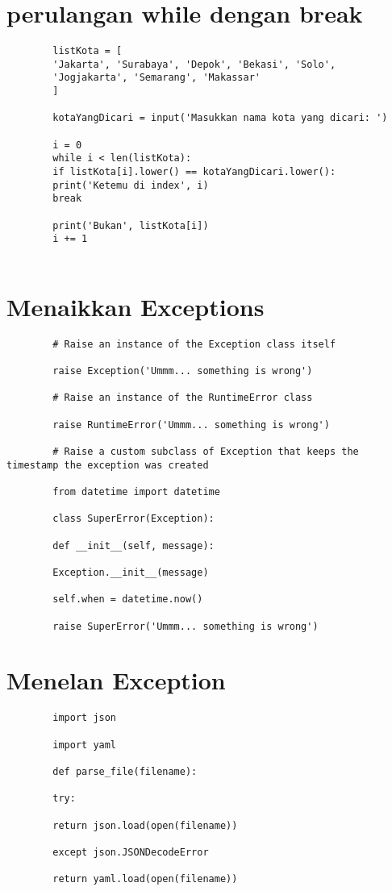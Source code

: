 \documentclass{article}
\begin{document}
	\section {perulangan while dengan break}
	\begin{lstlisting}
		listKota = [
		'Jakarta', 'Surabaya', 'Depok', 'Bekasi', 'Solo',
		'Jogjakarta', 'Semarang', 'Makassar'
		]
		
		kotaYangDicari = input('Masukkan nama kota yang dicari: ')
		
		i = 0
		while i < len(listKota):
		if listKota[i].lower() == kotaYangDicari.lower():
		print('Ketemu di index', i)
		break
		
		print('Bukan', listKota[i])
		i += 1
		
	\end{lstlisting}

	\section {Menaikkan Exceptions}
	\begin{lstlisting}
		# Raise an instance of the Exception class itself
		
		raise Exception('Ummm... something is wrong')
		
		# Raise an instance of the RuntimeError class
		
		raise RuntimeError('Ummm... something is wrong')
		
		# Raise a custom subclass of Exception that keeps the timestamp the exception was created
		
		from datetime import datetime
		
		class SuperError(Exception):
		
		def __init__(self, message):
		
		Exception.__init__(message)
		
		self.when = datetime.now()
		
		raise SuperError('Ummm... something is wrong')
	\end{lstlisting}

	\section {Menelan Exception}
	\begin{lstlisting}
		import json
		
		import yaml
		
		def parse_file(filename):
		
		try:
		
		return json.load(open(filename))
		
		except json.JSONDecodeError
		
		return yaml.load(open(filename))
	\end{lstlisting}
\end{document}
